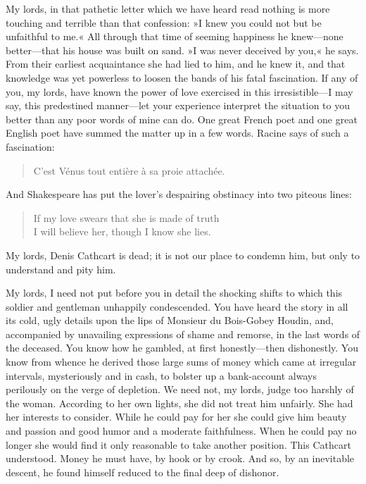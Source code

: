 \begin{dialogue}
My lords, in that pathetic letter which we have heard read nothing is more touching and terrible than that confession: »I knew you could not but be unfaithful to me.« All through that time of seeming happiness he knew\allowbreak---\allowbreak none better\allowbreak---\allowbreak that his house was built on sand. »I was never deceived by you,« he says. From their earliest acquaintance she had lied to him, and he knew it, and that knowledge was yet powerless to loosen the bands of his fatal fascination. If any of you, my lords, have known the power of love exercised in this irresistible\allowbreak---\allowbreak I may say, this predestined manner\allowbreak---\allowbreak let your experience interpret the situation to you better than any poor words of mine can do. One great French poet and one great English poet have summed the matter up in a few words. Racine says of such a fascination:

\begin{quote}C'est Vénus tout entière à sa proie attachée.\end{quote}

\smallskip 

And Shakespeare has put the lover's despairing obstinacy into two piteous lines:

\begin{verse}
If my love swears that she is made of truth\\
I will believe her, though I know she lies.\\
\end{verse}

\smallskip 

My lords, Denis Cathcart is dead; it is not our place to condemn him, but only to understand and pity him.

\smallskip 

My lords, I need not put before you in detail the shocking shifts to which this soldier and gentleman unhappily condescended. You have heard the story in all its cold, ugly details upon the lips of Monsieur du Bois-Gobey Houdin, and, accompanied by unavailing expressions of shame and remorse, in the last words of the deceased. You know how he gambled, at first honestly\allowbreak---\allowbreak then dishonestly. You know from whence he derived those large sums of money which came at irregular intervals, mysteriously and in cash, to bolster up a bank-account always perilously on the verge of depletion. We need not, my lords, judge too harshly of the woman. According to her own lights, she did not treat him unfairly. She had her interests to consider. While he could pay for her she could give him beauty and passion and good humor and a moderate faithfulness. When he could pay no longer she would find it only reasonable to take another position. This Cathcart understood. Money he must have, by hook or by crook. And so, by an inevitable descent, he found himself reduced to the final deep of dishonor.


\end{dialogue}
